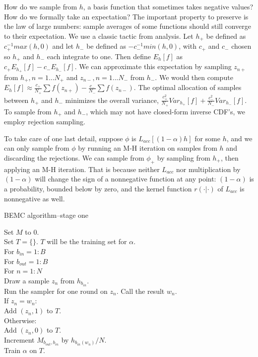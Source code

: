 \documentclass{article}
\begin{document}
How do we sample from $h$, a basis function that sometimes takes negative values? How do we formally take an expectation? The important property to preserve is the law of large numbers: sample averages of some functions should still converge to their expectation. We use a classic tactic from analysis. Let $h_+$ be defined as $c_+^{-1}max(h, 0)$ and let $h_-$ be defined as $-c_-^{-1}min(h, 0)$, with $c_+$ and $c_-$ chosen so $h_+$ and $h_-$ each integrate to one. Then define $E_{h}[f]$ as $c_+E_{h_+}[f]-c_-E_{h_-}[f]$. We can approximate this expectation by sampling $z_{n+}$ from $h_+, n=1...N_+$ and $z_{n-}, n=1...N_-$ from $h_-$. We would then compute $E_{h}[f] \approx \frac{c_+}{N_+}\sum f(z_{n+})-\frac{c_-}{N_-}\sum f(z_{n-})$. The optimal allocation of samples between $h_+$ and $h_-$ minimizes the overall variance, $\frac{c_+^2}{N_+}Var_{h_+}[f] + \frac{c_-^2}{N_-}Var_{h_-}[f]$. To sample from $h_+$ and $h_-$, which may not have closed-form inverse CDF's, we employ rejection sampling. 

To take care of one last detail, suppose $\phi$ is $L_{acc}[(1-\alpha)h]$ for some $h$, and we can only sample from $\phi$ by running an M-H iteration on samples from $h$ and discarding the rejections. We can sample from $\phi_+$ by sampling from $h_+$, then applying an M-H iteration. That is because neither $L_{acc}$ nor multiplication by $(1-\alpha)$ will change the sign of a nonnegative function at any point: $(1-\alpha)$ is a probability, bounded below by zero, and the kernel function $r(\cdot | \cdot)$ of $L_{acc}$ is nonnegative as well. 

\begin{algorithm}[h]
\caption{BEMC algorithm--stage one}
Set $M$ to $0$.\\
Set $T = \{\}$. $T$ will be the training set for $\alpha$.\\
For $b_{in}  = 1:B$\\
\Indp
For $b_{out}  = 1:B$\\
\Indp
For $n = 1:N$\\
\Indp
Draw a sample $z_n$ from $h_{b_{in}}$.\\
Run the sampler for one round on $z_n$. Call the result $w_n$.\\
If $z_n = w_n$:\\
\Indp
Add $(z_n, 1)$ to $T$.\\
\Indm
Otherwise:\\
\Indp
Add $(z_n, 0)$ to $T$.\\
Increment $M_{b_{out}, b_{in}}$ by $h_{b_{in}(w_n)}/N$.\\
\Indm
\Indm
\Indm
Train $\alpha$ on $T$.\\
\end{algorithm}
\end{document}
